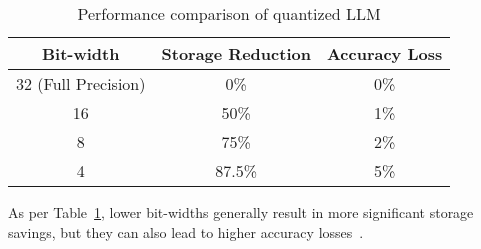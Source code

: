 \begin{table}[htbp]
	\centering
	\begin{tabular}{ccc}
		\toprule
		Bit-width           & Storage Reduction & Accuracy Loss \\
		\midrule
		32 (Full Precision) & 0\%               & 0\%           \\
		16                  & 50\%              & 1\%           \\
		8                   & 75\%              & 2\%           \\
		4                   & 87.5\%            & 5\%           \\
		\bottomrule
	\end{tabular}
	\caption{Performance comparison of quantized LLM}
	\label{tab:quant_perf}
\end{table}

As per Table~\ref{tab:quant_perf}, lower bit-widths generally result in more significant storage savings, but they can also lead to higher accuracy losses~\cite{jacob2017quantization}.
